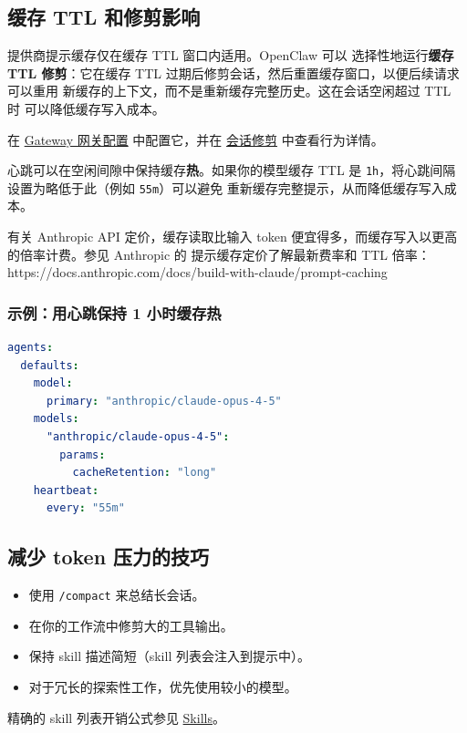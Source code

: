 \subsection{缓存 TTL 和修剪影响}


提供商提示缓存仅在缓存 TTL 窗口内适用。OpenClaw 可以
选择性地运行\textbf{缓存 TTL 修剪}：它在缓存 TTL
过期后修剪会话，然后重置缓存窗口，以便后续请求可以重用
新缓存的上下文，而不是重新缓存完整历史。这在会话空闲超过 TTL 时
可以降低缓存写入成本。

在 \href{/gateway/configuration}{Gateway 网关配置} 中配置它，并在
\href{/concepts/session-pruning}{会话修剪} 中查看行为详情。

心跳可以在空闲间隙中保持缓存\textbf{热}。如果你的模型缓存 TTL
是 \texttt{1h}，将心跳间隔设置为略低于此（例如 \texttt{55m}）可以避免
重新缓存完整提示，从而降低缓存写入成本。

有关 Anthropic API 定价，缓存读取比输入
token 便宜得多，而缓存写入以更高的倍率计费。参见 Anthropic 的
提示缓存定价了解最新费率和 TTL 倍率：
https://docs.anthropic.com/docs/build-with-claude/prompt-caching

\subsubsection{示例：用心跳保持 1 小时缓存热}


\begin{lstlisting}[language=yaml]
agents:
  defaults:
    model:
      primary: "anthropic/claude-opus-4-5"
    models:
      "anthropic/claude-opus-4-5":
        params:
          cacheRetention: "long"
    heartbeat:
      every: "55m"
\end{lstlisting}


\subsection{减少 token 压力的技巧}


\begin{itemize}
  \item 使用 \texttt{/compact} 来总结长会话。
  \item 在你的工作流中修剪大的工具输出。
  \item 保持 skill 描述简短（skill 列表会注入到提示中）。
  \item 对于冗长的探索性工作，优先使用较小的模型。
\end{itemize}


精确的 skill 列表开销公式参见 \href{/tools/skills}{Skills}。


